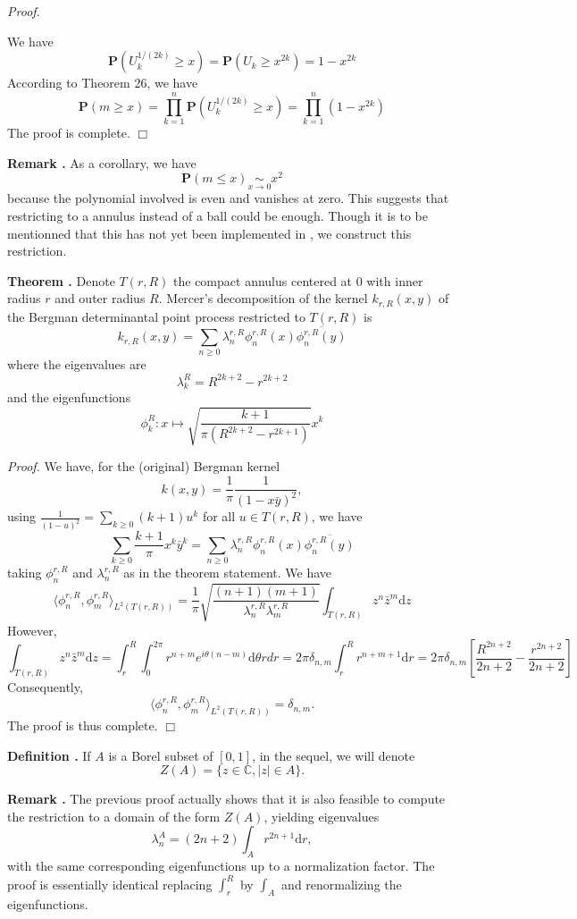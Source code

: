 \documentclass[11pt]{article}
\newcommand{\qed}{\hfill$\Box$}
\newcounter{cnt}
\newcommand{\cnt}{\thecnt \stepcounter{cnt}}
\begin{document}
\textit{Proof.}

We have
\[
\mathbf{P}(U_k^{1/(2k)} \ge x) = \mathbf{P}(U_k \ge x^{2k}) = 1 - x^{2k}
\]
According to Theorem 26, we have
\[
\mathbf{P}(m \ge x) = \prod_{k=1}^n \mathbf{P}(U_k^{1/(2k)} \ge x) = \prod_{k=1}^n (1 - x^{2k})
\]
The proof is complete. \qed

\textbf{Remark \cnt.} As a corollary, we have
\[
\mathbf{P}(m \leqslant x) \underset{x \to 0}{\sim} x^2
\]
because the polynomial involved is even and vanishes at zero. This suggests that restricting to a annulus instead of a ball could be enough. Though it is to be mentionned that this has not yet been implemented in \cite{MorozSoftware}, we construct this restriction.

\textbf{Theorem \cnt.} Denote $T(r,R)$ the compact annulus centered at 0 with inner radius $r$ and outer radius $R$. Mercer's decomposition of the kernel $k_{r,R}(x,y)$ of the Bergman determinantal point process restricted to $T(r,R)$ is
\[
k_{r,R}(x,y) = \sum_{n \ge 0} \lambda_n^{r,R} \phi_n^{r,R}(x) \overline{\phi_n^{r,R}(y)}
\]
where the eigenvalues are
\[
\lambda_k^R = R^{2k+2} - r^{2k+2}
\]
and the eigenfunctions
\[
\phi_k^R: x \mapsto \sqrt{\frac{k+1}{\pi(R^{2k+2} - r^{2k+1})}} x^k
\]

\textit{Proof.}
We have, for the (original) Bergman kernel
\[
k(x,y) = \frac{1}{\pi} \frac{1}{(1-x\bar{y})^2},
\]
using $\frac{1}{(1-u)^2} = \sum_{k \ge 0} (k+1)u^k$ for all $u \in T(r,R)$, we have
\[
\sum_{k \ge 0} \frac{k+1}{\pi} x^k \bar{y}^k = \sum_{n \ge 0} \lambda_n^{r,R} \phi_n^{r,R}(x) \overline{\phi_n^{r,R}(y)}
\]
taking $\phi_n^{r,R}$ and $\lambda_n^{r,R}$ as in the theorem statement. We have
\[
\langle \phi_n^{r,R}, \phi_m^{r,R} \rangle_{L^2(T(r,R))} = \frac{1}{\pi} \sqrt{\frac{(n+1)(m+1)}{\lambda_n^{r,R} \lambda_m^{r,R}}} \int_{T(r,R)} z^n \bar{z}^m \mathrm dz
\]
However,
\[
\int_{T(r,R)} z^n \bar{z}^m \mathrm dz = \int_r^R \int_0^{2\pi} r^{n+m} e^{i\theta(n-m)} \mathrm d\theta rdr = 2\pi \delta_{n,m} \int_r^R r^{n+m+1} \mathrm dr = 2\pi \delta_{n,m} \left[ \frac{R^{2n+2}}{2n+2} - \frac{r^{2n+2}}{2n+2} \right]
\]
Consequently,
\[
\langle \phi_n^{r,R}, \phi_m^{r,R} \rangle_{L^2(T(r,R))} = \delta_{n,m}.
\]
The proof is thus complete. \qed

\textbf{Definition \cnt.} If $A$ is a Borel subset of $[0,1]$, in the sequel, we will denote 
\[
Z(A) = \{z \in \mathbb{C}, |z| \in A\}.
\]

\textbf{Remark \cnt.} The previous proof actually shows that it is also feasible to compute the restriction to a domain of the form $ Z(A) $, yielding eigenvalues
\[
\lambda_n^A = (2n+2)\int_A r^{2n+1} \mathrm dr,
\] 
with the same corresponding eigenfunctions up to a normalization factor. The proof is essentially identical replacing $ \int_r^R $ by $ \int_A $ and renormalizing the eigenfunctions.
\end{document}
